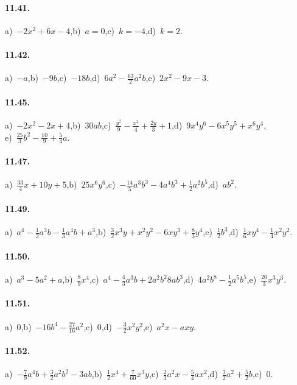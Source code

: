 \paragraph{11.41.}
a)~$-2x^2+6x-4$,\quad b)~$a=0$,\quad c)~$k=-4$,\quad d)~$k=2$.
\paragraph{11.42.} a)~$-a$,\quad b)~$-9b$,\quad c)~$-18b$,\quad d)~$6a^{2}-\frac{63}{2}a^{2}b$,\quad e)~$2x^2-9x-3$.
\paragraph{11.45.} a)~$-2x^{2}-2x+4$,\quad b)~$30ab$,\quad c)~$\frac{y^{2}}{9}-\frac{x^{2}}{4}+\frac{2y}{3}+1$,\quad d)~$9x^{4}y^{6}-6x^{5}y^{5}+x^{6}y^{4}$,\protect\\ e)~$\frac{25}{3}b^{2}-\frac{10}{9}+\frac{5}{4}a$.
\paragraph{11.47.} a)~$\frac{33}{4}x+10y+5$,\quad b)~$25x^{6}y^{6}$,\quad c)~$-\frac{14}{5}a^{3}b^{3}-4a^{4}b^{3}+\frac{1}{2}a^{2}b^{5}$,\quad d)~$ab^{2}$. %
\paragraph{11.49.} a)~$a^{4}-\frac{1}{2}a^{3}b-\frac{1}{3}a^{4}b+a^{3}$,\quad b)~$\frac{3}{2}x^{3}y+x^{2}y^{2}-6{xy}^{3}+\frac{8}{3}y^{4}$,\quad c)~$\frac{1}{2}b^{3}$,\quad d)~$\frac{1}{6}xy^{4}-\frac{1}{4}x^{2}y^{2}$.
\paragraph{11.50.} a)~$a^{3}-5a^{2}+a$,\quad b)~$\frac{8}{9}x^{4}$,\quad c)~$a^{4}-\frac{4}{3}a^{3}b+2a^{2}b^{2}8ab^{3}$,\quad d)~$4a^{2}b^{8}-\frac{1}{2}a^{5}b^{5}$,\quad e)~$\frac{20}{3}x^{3}y^{3}$.
\paragraph{11.51.} a)~$0$,\quad b)~$-16b^{4}-\frac{27}{16}a^{2}$,\quad c)~$0$,\quad d)~$-\frac{3}{2}x^{2}y^{2}$,\quad e)~$a^{2}x-axy$.
\paragraph{11.52.} a)~$-\frac{7}{9}a^{4}b+\frac{3}{2}a^2b^2-3ab$,\quad b)~$\frac{1}{2}x^{4}+\frac{7}{60}x^{3}y$,\quad c)~$\frac{2}{3}a^{2}x-\frac{5}{4}ax^{2}$,\quad d)~$\frac{3}{2}a^{2}+\frac{5}{2}b$,\quad e)~$0$.
